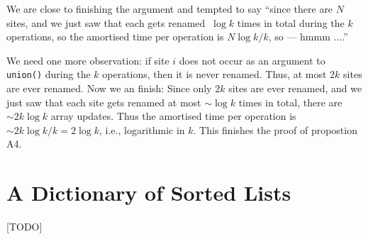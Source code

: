 \documentclass{tufte-handout}
\begin{document}
We are close to finishing the argument and tempted to say ``since
there are $N$ sites, and we just saw that each gets renamed $~\log k$
times in total during the $k$ operations, so the amortised time per
operation is $N\log k / k$, so --- hmmm $\ldots$.''

We need one more observation: if site $i$ does not occur as an
argument to {\tt union()} during the $k$ operations, then it is never
renamed. Thus, at most $2k$ sites are ever renamed. Now we an finish:
Since only $2k$ sites are ever renamed, and we just saw that each site
gets renamed at most $\sim\log k$ times in total, there are $\sim
2k\log k$ array updates. Thus the amortised time per operation is
$\sim 2k\log k / k = 2\log k$, i.e., logarithmic in $k$. This finishes
the proof of propostion A4.

\section{A Dictionary of Sorted Lists}

[TODO]
\end{document}
